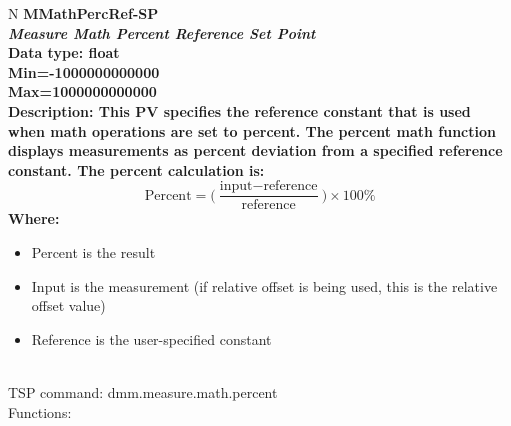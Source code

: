 \documentclass[openany]{article}
\begin{document}
		\begin{tabular}{N}
			\hline
			\bfseries MMathPercRef-SP\label{pv:mmathpercref-sp} \\ \hline
			\emph{Measure Math Percent Reference Set Point} \\
			Data type: float \\
			Min=-1000000000000 \\
			Max=1000000000000 \\
			Description: This PV specifies the reference constant that is used when math operations are set to percent. The percent math function displays measurements as percent deviation from a specified reference constant. The percent calculation is: $$ \text{Percent} = \bigg(\frac{\text{input} - \text{reference}}{\text{reference}}\bigg)\times 100\% $$ Where: \begin{itemize} \item Percent is the result
\item Input is the measurement (if relative offset is being used, this is the relative offset value) \item Reference is the user-specified constant \end{itemize} \\
			TSP command: dmm.measure.math.percent \\
			Functions: \\
			\arrayrulecolor{\FuncTableBorderColor}

		\end{tabular}
\end{document}
